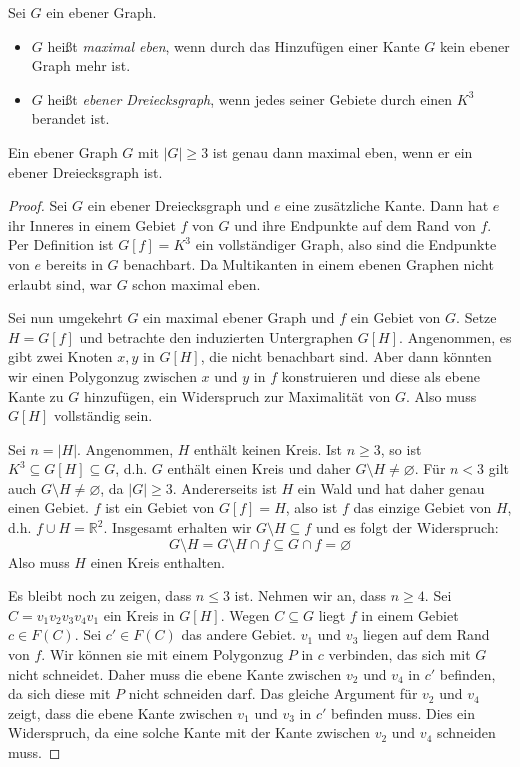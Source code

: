 \documentclass[10pt,b5paper]{article}
\begin{document}
\begin{definition}
Sei $G$ ein ebener Graph.
\begin{itemize}
\item $G$ heißt \textit{maximal eben}, wenn durch das Hinzufügen einer Kante $G$ kein ebener Graph mehr ist.
\item $G$ heißt \textit{ebener Dreiecksgraph}, wenn jedes seiner Gebiete durch einen $K^3$ berandet ist.
\end{itemize}
\end{definition}

\begin{proposition}
Ein ebener Graph $G$ mit $|G|\geq 3$ ist genau dann maximal eben, wenn er ein ebener Dreiecksgraph ist.
\end{proposition}

\begin{proof}
Sei $G$ ein ebener Dreiecksgraph und $e$ eine zusätzliche Kante. Dann hat $e$ ihr Inneres in einem Gebiet $f$ von $G$ und ihre Endpunkte auf dem Rand von $f$. Per Definition ist $G[f] = K^3$ ein vollständiger Graph, also sind die Endpunkte von $e$ bereits in $G$ benachbart. Da Multikanten in einem ebenen Graphen nicht erlaubt sind, war $G$ schon maximal eben.

Sei nun umgekehrt $G$ ein maximal ebener Graph und $f$ ein Gebiet von $G$. Setze $H=G[f]$ und betrachte den induzierten Untergraphen $G[H]$. Angenommen, es gibt zwei Knoten $x,y$ in $G[H]$, die nicht benachbart sind. Aber dann könnten wir einen Polygonzug zwischen $x$ und $y$ in $f$ konstruieren und diese als ebene Kante zu $G$ hinzufügen, ein Widerspruch zur Maximalität von $G$. Also muss $G[H]$ vollständig sein.

Sei $n = |H|$. Angenommen, $H$ enthält keinen Kreis. Ist $n\geq 3$, so ist $K^3\subseteq G[H]\subseteq G$, d.h. $G$ enthält einen Kreis und daher $G\setminus H \neq\varnothing$. Für $n<3$ gilt auch $G\setminus H\neq\varnothing$, da $|G|\geq 3$. Andererseits ist $H$ ein Wald und hat daher genau einen Gebiet. $f$ ist ein Gebiet von $G[f] = H$, also ist $f$ das einzige Gebiet von $H$, d.h. $f\cup H = \mathbb{R}^2$. Insgesamt erhalten wir $G\setminus H \subseteq f$ und es folgt der Widerspruch:
\[ G\setminus H = G\setminus H \cap f \subseteq G\cap f =\varnothing \]
Also muss $H$ einen Kreis enthalten.

Es bleibt noch zu zeigen, dass $n\leq 3$ ist. Nehmen wir an, dass $n\geq 4$. Sei $C = v_1v_2v_3v_4v_1$ ein Kreis in $G[H]$. Wegen $C\subseteq G$ liegt $f$ in einem Gebiet $c\in F(C)$. Sei $c'\in F(C)$ das andere Gebiet. $v_1$ und $v_3$ liegen auf dem Rand von $f$. Wir können sie mit einem Polygonzug $P$ in $c$ verbinden, das sich mit $G$ nicht schneidet. Daher muss die ebene Kante zwischen $v_2$ und $v_4$ in $c'$ befinden, da sich diese mit $P$ nicht schneiden darf. Das gleiche Argument für $v_2$ und $v_4$ zeigt, dass die ebene Kante zwischen $v_1$ und $v_3$ in $c'$ befinden muss. Dies ein Widerspruch, da eine solche Kante mit der Kante zwischen $v_2$ und $v_4$ schneiden muss.
\end{proof}
\end{document}
